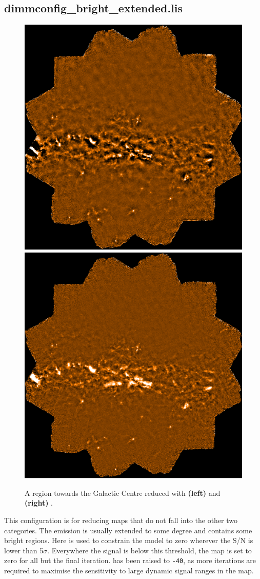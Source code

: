 \documentclass[11pt,oneside,chapters]{starlink}
\begin{document}
\subsection{dimmconfig\_bright\_extended.lis}

\begin{latexonly}
\begin{figure}[t!]
\includegraphics[width=0.47\linewidth]{sc21_gal_def}
\hspace{3mm}
\includegraphics[width=0.47\linewidth]{sc21_gal_brex}
\caption[Example map reduced with
  ]
 {A region towards the Galactic Centre reduced with \textbf{(left)}
    and \textbf{(right)}
   .\label{fig:becompare}}
\end{figure}

This configuration is for reducing maps that do not fall into the
other two categories. The emission is usually extended to some degree
and contains some bright regions. Here  is used
to constrain the  model to zero wherever the S/N is lower
than 5$\sigma$.  Everywhere the signal is below this threshold, the
map is set to zero for all but the final iteration. 
has been raised to \texttt{-40}, as more iterations are required to
maximise the sensitivity to large dynamic signal ranges in the map.


\end{latexonly}
\end{document}

